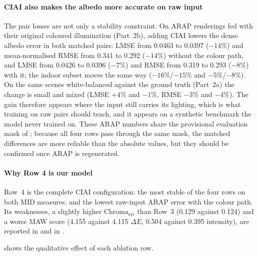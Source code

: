 \paragraph{CIAI also makes the albedo more accurate on raw input}
The pair losses are not only a stability constraint. On ARAP renderings fed with their
original coloured illumination (Part~2b), adding CIAI lowers the dense albedo error in both
matched pairs: LMSE from 0.0463 to 0.0397 ($-14\%$) and mean-normalised RMSE from 0.341 to
0.292 ($-14\%$) without the colour path, and LMSE from 0.0426 to 0.0396 ($-7\%$) and RMSE from
0.319 to 0.293 ($-8\%$) with it; the indoor subset moves the same way ($-16\%$/$-15\%$ and
$-5\%$/$-8\%$). On the same scenes white-balanced against the ground truth (Part~2a) the
change is small and mixed (LMSE $+4\%$ and $-1\%$, RMSE $-3\%$ and $-4\%$). The gain therefore
appears where the input still carries its lighting, which is what training on raw pairs
should teach, and it appears on a synthetic benchmark the model never trained on. These ARAP
numbers share the provisional evaluation mask of ; because all four
rows pass through the same mask, the matched differences are more reliable than the absolute
values, but they should be confirmed once ARAP is regenerated.

\paragraph{Why Row 4 is our model}
Row~4 is the complete CIAI configuration: the most stable of the four rows on both MID
measures, and the lowest raw-input ARAP
error with the colour path. Its weaknesses, a slightly higher $\text{Chroma}_{\text{err}}$ than
Row~3 (0.129 against 0.124) and a worse MAW score (4.155 against 4.115 $\Delta E$, 0.504 against
0.395 intensity), are reported in  and in .

 shows the qualitative effect of each ablation row.

